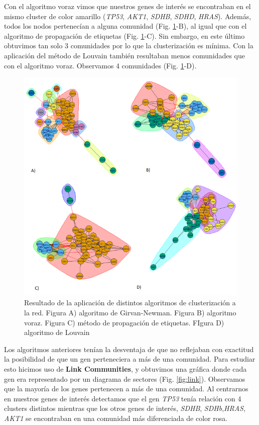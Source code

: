 \vspace{3pt}

Con el algoritmo voraz vimos que nuestros genes de interés se encontraban en el mismo cluster de color amarillo (\textit{TP53}, \textit{AKT1}, \textit{SDHB}, \textit{SDHD}, \textit{HRAS}). Además, todos los nodos pertenecían a alguna comunidad (Fig. \ref{fig:algoritmos}-B), al igual que con el algoritmo de propagación de etiquetas (Fig. \ref{fig:algoritmos}-C). Sin embargo, en este último obtuvimos tan solo 3 comunidades por lo que la clusterización es mínima.  Con la aplicación del método de Louvain también resultaban menos comunidades que con el algoritmo voraz. Observamos 4 comunidades (Fig. \ref{fig:algoritmos}-D). 

\begin{figure}
	\centering
	\includegraphics[width=0.98\linewidth]{figures/algoritmos}
	\captionsetup{labelformat=empty}
	\caption{Resultado de la aplicación de distintos algoritmos de clusterización a la red. Figura A) algoritmo de Girvan-Newman. Figura B) algoritmo voraz. Figura C) método de propagación de etiquetas. FIgura D) algoritmo de Louvain}
	\label{fig:algoritmos}
\end{figure} 



Los algoritmos anteriores tenían la desventaja de que no reflejaban con exactitud la posibilidad de que un gen perteneciera a más de una comunidad. Para estudiar esto hicimos uso de \textbf{Link Communities}, y obtuvimos una gráfica donde cada gen era representado por un diagrama de sectores (Fig. \ref{fig:link}). Observamos que la mayoría de los genes pertenecen a más de una comunidad. Al centrarnos en nuestros genes de interés detectamos que el gen \textit{TP53} tenía relación con 4 clusters distintos mientras que los otros genes de interés, \textit{SDHB}, \textit{SDHb},\textit{HRAS}, \textit{AKT1} se encontraban en una comunidad más diferenciada de color rosa. 

